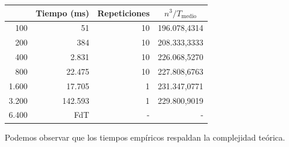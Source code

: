 \documentclass[12pt,a4paper]{article}
\begin{document}
\begin{table}[H]
\renewcommand{\arraystretch}{1.2}
\centering
\begin{tabular}{|r|r|r|r|}
\hline
\rowcolor{LightSteelBlue2}
\multicolumn{1}{|c|}{n} & \multicolumn{1}{c|}{Tiempo (ms)} & \multicolumn{1}{c|}{Repeticiones} & \multicolumn{1}{c|}{$n^3/T_\text{medio}$} \\ \hline
100                     & 51                               & 10                                & 196.078,4314                                       \\ \hline
200                     & 384                              & 10                                & 208.333,3333                                       \\ \hline
400                     & 2.831                            & 10                                & 226.068,5270                                       \\ \hline
800                     & 22.475                           & 10                                & 227.808,6763                                       \\ \hline
1.600                   & 17.705                           & 1                                 & 231.347,0771                                       \\ \hline
3.200                   & 142.593                          & 1                                 & 229.800,9019                                       \\ \hline
6.400                & FdT                              & -                                 & -                                                  \\ \hline
\end{tabular}
\end{table}
Podemos observar que los tiempos empíricos respaldan la complejidad teórica.
\end{document}
